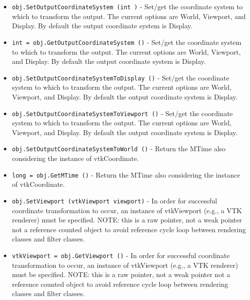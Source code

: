 \begin{itemize}
\item  \verb|obj.SetOutputCoordinateSystem (int )| -  Set/get the coordinate system to which to transform the output.
 The current options are World, Viewport, and Display. By default the
 output coordinate system is Display.

\item  \verb|int = obj.GetOutputCoordinateSystem ()| -  Set/get the coordinate system to which to transform the output.
 The current options are World, Viewport, and Display. By default the
 output coordinate system is Display.

\item  \verb|obj.SetOutputCoordinateSystemToDisplay ()| -  Set/get the coordinate system to which to transform the output.
 The current options are World, Viewport, and Display. By default the
 output coordinate system is Display.

\item  \verb|obj.SetOutputCoordinateSystemToViewport ()| -  Set/get the coordinate system to which to transform the output.
 The current options are World, Viewport, and Display. By default the
 output coordinate system is Display.

\item  \verb|obj.SetOutputCoordinateSystemToWorld ()| -  Return the MTime also considering the instance of vtkCoordinate.

\item  \verb|long = obj.GetMTime ()| -  Return the MTime also considering the instance of vtkCoordinate.

\item  \verb|obj.SetViewport (vtkViewport viewport)| -  In order for successful coordinate transformation to occur, an
 instance of vtkViewport (e.g., a VTK renderer) must be specified.
 NOTE: this is a raw pointer, not a weak pointer not a reference counted
 object to avoid reference cycle loop between rendering classes and filter
 classes.

\item  \verb|vtkViewport = obj.GetViewport ()| -  In order for successful coordinate transformation to occur, an
 instance of vtkViewport (e.g., a VTK renderer) must be specified.
 NOTE: this is a raw pointer, not a weak pointer not a reference counted
 object to avoid reference cycle loop between rendering classes and filter
 classes.

\end{itemize}
